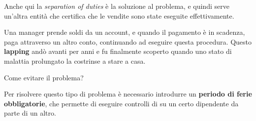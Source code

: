 \begin{Answer} [
  ref={fr2},
  number={2}
 ]

 \Question Anche qui la \textit{separation of duties} è la soluzione al
problema, e quindi serve un'altra entità che certifica che le vendite sono
state eseguite effettivamente.

\end{Answer}


\begin{Exercise} [
  title={Caso di Lepping},
  label={fr3}
 ]

 Una manager prende soldi da un account, e quando il pagamento è in scadenza,
paga attraverso un altro conto, continuando ad eseguire questa procedura.
Questo \textbf{lapping} andò avanti per anni e fu finalmente scoperto quando uno
stato di malattia prolungato la costrinse a stare a casa.

  \Question Come evitare il problema?
\end{Exercise}

\begin{Answer} [
  ref={fr3},
  number={3}
 ]

 \Question Per risolvere questo tipo di problema è necessario introdurre un
\textbf{periodo di ferie obbligatorie}, che permette di eseguire controlli di
su un certo dipendente da parte di un altro.

\end{Answer}

